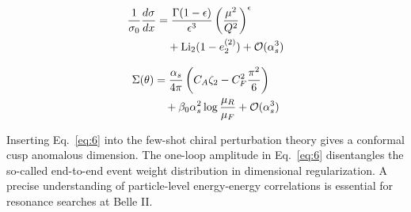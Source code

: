 \begin{align}
  \frac{1}{\sigma_0} \frac{d\sigma}{dx} &= \frac{\Gamma(1-\epsilon)}{\epsilon^{3}} \left(\frac{\mu^2}{Q^2}\right)^{\epsilon} \nonumber \\
  &\quad + \mathrm{Li}_{2}(1 - e_2^{(2)}) + \mathcal{O}(\alpha_s^3) \label{eq:7}
\end{align}

\begin{align}
  \Sigma(\theta) &= \frac{\alpha_s}{4\pi} \left( C_A \zeta_{2} - C_F^2 \frac{\pi^2}{6} \right) \nonumber \\
  &\quad + \beta_0 \alpha_s^2 \log\frac{\mu_R}{\mu_F} + \mathcal{O}(\alpha_s^3) \label{eq:8}
\end{align}

Inserting Eq.~\eqref{eq:6} into the few-shot chiral perturbation theory
gives a conformal cusp anomalous dimension. The one-loop amplitude in
Eq.~\eqref{eq:6} disentangles the so-called end-to-end event weight
distribution in dimensional regularization. A precise understanding of
particle-level energy-energy correlations is essential for resonance
searches at Belle II.

